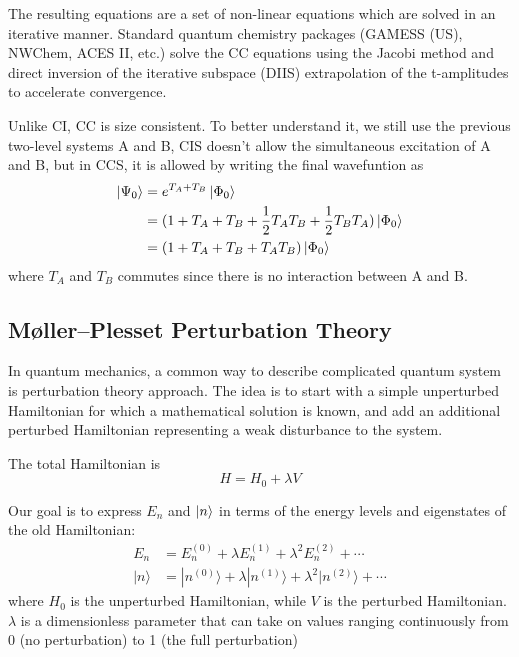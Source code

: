 The resulting equations are a set of non-linear equations which are solved in an iterative manner. 
Standard quantum chemistry packages (GAMESS (US), NWChem, ACES II, etc.) solve the CC equations using the Jacobi method and direct inversion of the iterative subspace (DIIS) extrapolation of the t-amplitudes to accelerate convergence.

Unlike CI, CC is size consistent.
To better understand it, we still use the previous two-level systems A and B, CIS doesn't allow the simultaneous excitation of A and B, but in CCS, it is allowed by writing the final wavefuntion as 
\begin{equation}
\begin{aligned}
	\ket{\Psi_0}&=e^{T_A+T_B}\ket{\Phi_0}
	\\
	&=(1+T_A+T_B+\frac{1}{2}T_AT_B+\frac{1}{2}T_BT_A)\ket{\Phi_0}
	\\
	&=(1+T_A+T_B+T_AT_B)\ket{\Phi_0}
\end{aligned}
\end{equation}
where $T_A$ and $T_B$ commutes since there is no interaction between A and B.

\subsection{M{\o}ller–Plesset Perturbation Theory}
In quantum mechanics, a common way to describe complicated quantum system is perturbation theory approach.
The idea is to start with a simple unperturbed Hamiltonian for which a mathematical solution is known, and add an additional perturbed Hamiltonian representing a weak disturbance to the system.

The total Hamiltonian is
\begin{equation}
H=H_{0}+\lambda V
\end{equation}

Our goal is to express $E_n$ and $\ket{n}$  in terms of the energy levels and eigenstates of the old Hamiltonian:
\begin{equation}
\begin{aligned}
	E_{n}&=E_{n}^{(0)}+\lambda E_{n}^{(1)}+\lambda^{2} E_{n}^{(2)}+\cdots
	\\
	| n \rangle&=| n^{(0)} \rangle+\lambda | n^{(1)} \rangle+\lambda^{2} | n^{(2)} \rangle+\cdots
\end{aligned}
\end{equation}
where $H_0$ is the unperturbed Hamiltonian, while $V$ is the perturbed Hamiltonian.
$\lambda$ is a dimensionless parameter that can take on values ranging continuously from 0 (no perturbation) to 1 (the full perturbation)

